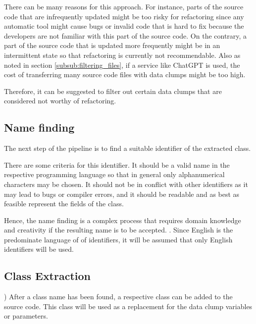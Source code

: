 There can be many reasons for this approach. For instance, parts of the source code that are infrequently updated might be too risky for refactoring since any automatic tool might cause bugs or invalid code that is hard to fix because the developers are not familiar with this part of the source code. On the contrary, a part of the source code that is updated more frequently might be in an intermittent state so that refactoring is currently not recommendable. Also as noted in section  \ref{subsub:filtering_files}, if a service like ChatGPT is used, the cost of transferring many source code files with data clumps might be too high. 

Therefore, it can be suggested to filter out certain data clumps that are considered not worthy of refactoring.

\subsection{Name finding}\label{subsec:chap3_data_clump_name_finding}
The next step of the pipeline is to find a suitable identifier of the extracted class.

There are some criteria for this identifier. It should be a valid name in the respective programming language so that in general only alphanumerical characters may be chosen. It should not be  in conflict with other identifiers as it may lead to bugs or compiler errors, and it should be readable and as best as feasible represent the fields of the class.

Hence, the name finding is a complex process that requires domain knowledge and creativity if the resulting name is to be accepted. . 
Since English is the predominate language of of identifiers, it will be assumed that only English identifiers will be used. 


\subsection{Class Extraction}\label{subsec:chap3_data_class_extraction})
After a class name has been found, a respective class can be added to the source code. This class will be used as a replacement  for the data clump variables or parameters. 

